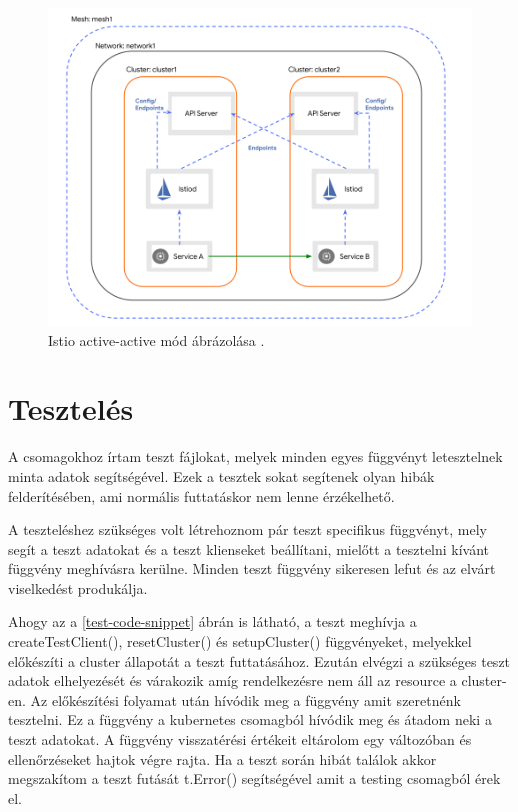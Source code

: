 \begin{figure}[ht]
  \centering
       \includegraphics[width=1.0\textwidth]{figures/kli/active-active.png}
        \caption{Istio active-active mód ábrázolása \cite{istioaa}.}
         \label{active-active}
\end{figure}

\section{Tesztelés}
A csomagokhoz írtam teszt fájlokat, melyek minden egyes függvényt letesztelnek minta adatok segítségével.
Ezek a tesztek sokat segítenek olyan hibák felderítésében, ami normális futtatáskor nem lenne érzékelhető.

A teszteléshez szükséges volt létrehoznom pár teszt specifikus függvényt, mely segít a teszt adatokat és a teszt klienseket beállítani, mielőtt a tesztelni kívánt függvény meghívásra kerülne. Minden teszt függvény sikeresen lefut és az elvárt viselkedést produkálja.

Ahogy az a \ref{test-code-snippet} ábrán is látható, a teszt meghívja a createTestClient(), resetCluster() és setupCluster() függvényeket, melyekkel előkészíti a cluster állapotát a teszt futtatásához.
Ezután elvégzi a szükséges teszt adatok elhelyezését és várakozik amíg rendelkezésre nem áll az resource a cluster-en.
Az előkészítési folyamat után hívódik meg a függvény amit szeretnénk tesztelni.
Ez a függvény a kubernetes csomagból hívódik meg és átadom neki a teszt adatokat.
A függvény visszatérési értékeit eltárolom egy változóban és ellenőrzéseket hajtok végre rajta.
Ha a teszt során hibát találok akkor megszakítom a teszt futását t.Error() segítségével amit a testing csomagból érek el.

